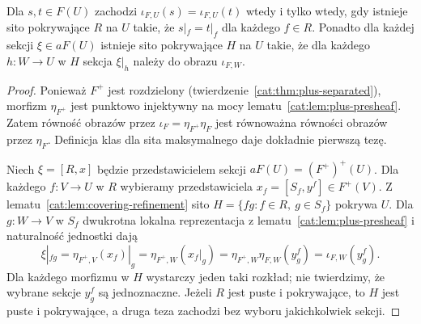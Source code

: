 \begin{stwierdzenie}\label{cat:prop:sheafification-unit-local}
Dla $s,t\in F(U)$ zachodzi $\iota_{F,U}(s)=\iota_{F,U}(t)$ wtedy i tylko wtedy, gdy istnieje sito pokrywające $R$ na $U$ takie, że $s|_f=t|_f$ dla każdego $f\in R$. Ponadto dla każdej sekcji $\xi\in aF(U)$ istnieje sito pokrywające $H$ na $U$ takie, że dla każdego $h:W\to U$ w $H$ sekcja $\xi|_h$ należy do obrazu $\iota_{F,W}$.
\end{stwierdzenie}
\begin{proof}
Ponieważ $F^+$ jest rozdzielony (twierdzenie~\ref{cat:thm:plus-separated}), morfizm $\eta_{F^+}$ jest punktowo injektywny na mocy lematu~\ref{cat:lem:plus-presheaf}. Zatem równość obrazów przez $\iota_F=\eta_{F^+}\eta_F$ jest równoważna równości obrazów przez $\eta_F$. Definicja klas dla sita maksymalnego daje dokładnie pierwszą tezę.

Niech $\xi=[R,x]$ będzie przedstawicielem sekcji $aF(U)=(F^+)^+(U)$. Dla każdego $f:V\to U$ w $R$ wybieramy przedstawiciela $x_f=[S_f,y^f]\in F^+(V)$. Z lematu~\ref{cat:lem:covering-refinement} sito $H=\{fg:f\in R,\ g\in S_f\}$ pokrywa $U$. Dla $g:W\to V$ w $S_f$ dwukrotna lokalna reprezentacja z lematu~\ref{cat:lem:plus-presheaf} i naturalność jednostki dają
\[
 \xi|_{fg}
 =\eta_{F^+,V}(x_f)|_g
 =\eta_{F^+,W}(x_f|_g)
 =\eta_{F^+,W}\eta_{F,W}(y^f_g)
 =\iota_{F,W}(y^f_g).
\]
Dla każdego morfizmu w $H$ wystarczy jeden taki rozkład; nie twierdzimy, że wybrane sekcje $y^f_g$ są jednoznaczne. Jeżeli $R$ jest puste i pokrywające, to $H$ jest puste i pokrywające, a druga teza zachodzi bez wyboru jakichkolwiek sekcji.
\end{proof}


